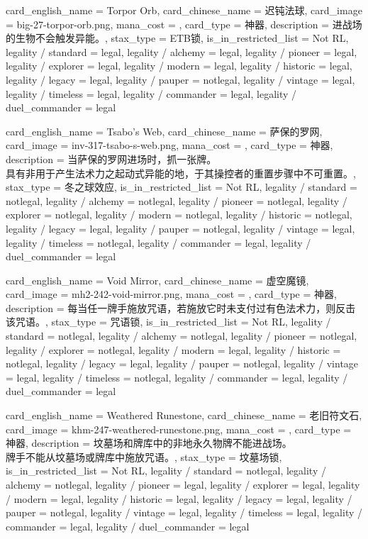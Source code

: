 \documentclass[lang = cn, color = black, 10pt]{AllThatStax}
\begin{document}
\card
{
	card_english_name = {Torpor Orb},
	card_chinese_name = {迟钝法球},
	card_image = big-27-torpor-orb.png,
	mana_cost = ,
	card_type = 神器,
	description = {进战场的生物不会触发异能。},
	stax_type = ETB锁,
	is_in_restricted_list = Not RL,
	legality / standard = legal,
	legality / alchemy = legal,
	legality / pioneer = legal,
	legality / explorer = legal,
	legality / modern = legal,
	legality / historic = legal,
	legality / legacy = legal,
	legality / pauper = notlegal,
	legality / vintage = legal,
	legality / timeless = legal,
	legality / commander = legal,
	legality / duel_commander = legal
}

\card
{
	card_english_name = {Tsabo's Web},
	card_chinese_name = {萨保的罗网},
	card_image = inv-317-tsabo-s-web.png,
	mana_cost = ,
	card_type = 神器,
	description = {当萨保的罗网进场时，抓一张牌。\\
具有非用于产生法术力之起动式异能的地，于其操控者的重置步骤中不可重置。},
	stax_type = 冬之球效应,
	is_in_restricted_list = Not RL,
	legality / standard = notlegal,
	legality / alchemy = notlegal,
	legality / pioneer = notlegal,
	legality / explorer = notlegal,
	legality / modern = notlegal,
	legality / historic = notlegal,
	legality / legacy = legal,
	legality / pauper = notlegal,
	legality / vintage = legal,
	legality / timeless = notlegal,
	legality / commander = legal,
	legality / duel_commander = legal
}

\card
{
	card_english_name = {Void Mirror},
	card_chinese_name = {虚空魔镜},
	card_image = mh2-242-void-mirror.png,
	mana_cost = ,
	card_type = 神器,
	description = {每当任一牌手施放咒语，若施放它时未支付过有色法术力，则反击该咒语。},
	stax_type = 咒语锁,
	is_in_restricted_list = Not RL,
	legality / standard = notlegal,
	legality / alchemy = notlegal,
	legality / pioneer = notlegal,
	legality / explorer = notlegal,
	legality / modern = legal,
	legality / historic = notlegal,
	legality / legacy = legal,
	legality / pauper = notlegal,
	legality / vintage = legal,
	legality / timeless = notlegal,
	legality / commander = legal,
	legality / duel_commander = legal
}

\card
{
	card_english_name = {Weathered Runestone},
	card_chinese_name = {老旧符文石},
	card_image = khm-247-weathered-runestone.png,
	mana_cost = ,
	card_type = 神器,
	description = {坟墓场和牌库中的非地永久物牌不能进战场。\\
牌手不能从坟墓场或牌库中施放咒语。},
	stax_type = 坟墓场锁,
	is_in_restricted_list = Not RL,
	legality / standard = notlegal,
	legality / alchemy = notlegal,
	legality / pioneer = legal,
	legality / explorer = legal,
	legality / modern = legal,
	legality / historic = legal,
	legality / legacy = legal,
	legality / pauper = notlegal,
	legality / vintage = legal,
	legality / timeless = legal,
	legality / commander = legal,
	legality / duel_commander = legal
}
\end{document}
